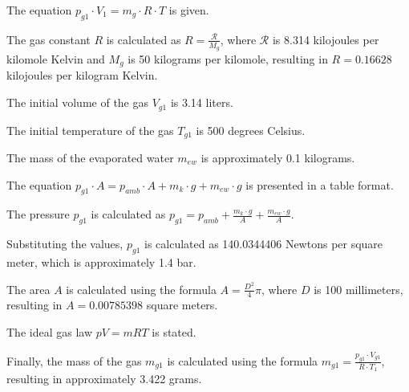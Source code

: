 The equation \( p_{g1} \cdot V_1 = m_g \cdot R \cdot T \) is given.

The gas constant \( R \) is calculated as \( R = \frac{\mathcal{R}}{M_g} \), where \( \mathcal{R} \) is 8.314 kilojoules per kilomole Kelvin and \( M_g \) is 50 kilograms per kilomole, resulting in \( R = 0.16628 \) kilojoules per kilogram Kelvin.

The initial volume of the gas \( V_{g1} \) is 3.14 liters.

The initial temperature of the gas \( T_{g1} \) is 500 degrees Celsius.

The mass of the evaporated water \( m_{ew} \) is approximately 0.1 kilograms.

The equation \( p_{g1} \cdot A = p_{amb} \cdot A + m_k \cdot g + m_{ew} \cdot g \) is presented in a table format.

The pressure \( p_{g1} \) is calculated as \( p_{g1} = p_{amb} + \frac{m_k \cdot g}{A} + \frac{m_{ew} \cdot g}{A} \).

Substituting the values, \( p_{g1} \) is calculated as 140.0344406 Newtons per square meter, which is approximately 1.4 bar.

The area \( A \) is calculated using the formula \( A = \frac{D^2}{4} \pi \), where \( D \) is 100 millimeters, resulting in \( A = 0.00785398 \) square meters.

The ideal gas law \( pV = mRT \) is stated.

Finally, the mass of the gas \( m_{g1} \) is calculated using the formula \( m_{g1} = \frac{p_{g1} \cdot V_{g1}}{R \cdot T_1} \), resulting in approximately 3.422 grams.